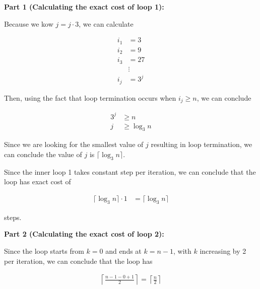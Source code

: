 \documentclass[12pt]{article}
\begin{document}
\begin{enumerate}[a.]
\begin{mdframed}
        \bigskip

        \textbf{Part 1 (Calculating the exact cost of loop 1):}

        \bigskip

        Because we kow $j = j \cdot 3$, we can calculate

        \begin{align*}
            i_1 &= 3\\
            i_2 &= 9\\
            i_3 &= 27\\
            &\vdots\\
            i_j &= 3^j
        \end{align*}

        \bigskip

        Then, using the fact that loop termination occurs when $i_j \geq n$, we can
        conclude

        \setcounter{equation}{0}
        \begin{align}
            3^j &\geq n\\
            j &\geq \log_3 n
        \end{align}

        \bigskip

        Since we are looking for the smallest value of $j$ resulting in loop termination,
        we can conclude the value of $j$ is $\lceil \log_3 n \rceil$.

        \bigskip

        Since the inner loop 1 takes constant step per iteration, we can conclude that
        the loop has exact cost of

        \begin{align}
            \lceil \log_3 n \rceil \cdot 1 &= \lceil \log_3 n \rceil
        \end{align}

        steps.

        \bigskip

        \textbf{Part 2 (Calculating the exact cost of loop 2):}

        \bigskip

        Since the loop starts from $k = 0$ and ends at $k = n - 1$, with $k$ increasing
        by 2 per iteration, we can conclude that the loop has

        \begin{align}
            \left\lceil \frac{n - 1 -0 + 1}{2} \right\rceil = \left\lceil \frac{n}{2} \right\rceil
        \end{align}


\end{mdframed}
\end{enumerate}
\end{document}
